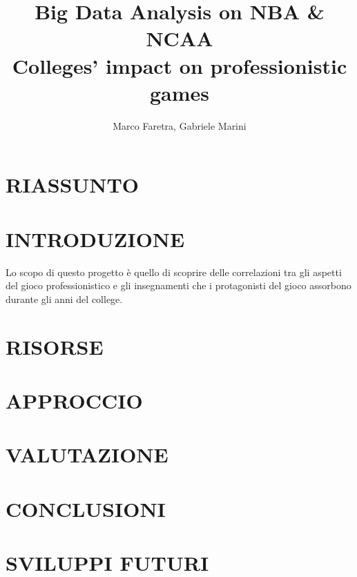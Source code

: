 \documentclass[10pt,a4paper]{article}
\author{Marco Faretra, Gabriele Marini}
\title{\textbf{Big Data Analysis on NBA \& NCAA}\\Colleges' impact on professionistic games}
\begin{document}
	
\maketitle
\thispagestyle{empty}
\pagestyle{empty}
		
\section*{RIASSUNTO}

\section{INTRODUZIONE} 

Lo scopo di questo progetto è quello di scoprire delle correlazioni tra gli aspetti del gioco professionistico e gli insegnamenti che i protagonisti del gioco assorbono durante gli anni del college.

\section{RISORSE}
\section{APPROCCIO}
\section{VALUTAZIONE}

\section{CONCLUSIONI}

\section{SVILUPPI FUTURI}
\end{document}
